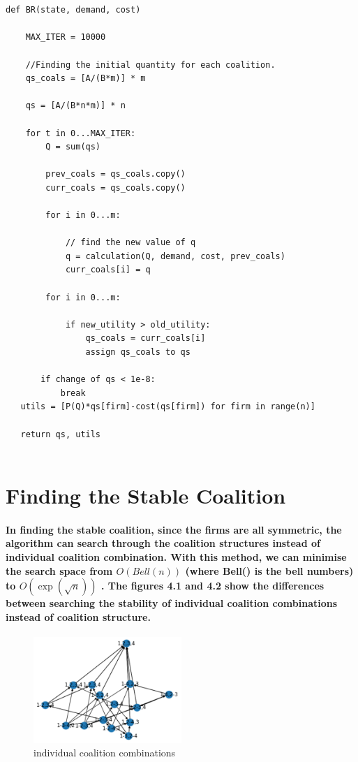 \documentclass[11pt]{report}
\begin{document}
\

\begin{lstlisting}

def BR(state, demand, cost)
    
    MAX_ITER = 10000
    
    //Finding the initial quantity for each coalition. 
    qs_coals = [A/(B*m)] * m 
    
    qs = [A/(B*n*m)] * n 

    for t in 0...MAX_ITER:
        Q = sum(qs)
        
        prev_coals = qs_coals.copy()
        curr_coals = qs_coals.copy()

        for i in 0...m:
        
            // find the new value of q
            q = calculation(Q, demand, cost, prev_coals) 
            curr_coals[i] = q
            
        for i in 0...m:
            
            if new_utility > old_utility:
                qs_coals = curr_coals[i]
                assign qs_coals to qs 
       
       if change of qs < 1e-8:
           break
   utils = [P(Q)*qs[firm]-cost(qs[firm]) for firm in range(n)]        
   
   return qs, utils


\end{lstlisting}

\section{Finding the Stable Coalition}
\paragraph{In finding the stable coalition, since the firms are all symmetric, the algorithm can search through the coalition structures instead of individual coalition combination. With this method, we can minimise the search space from $O(Bell(n))$ (where Bell() is the bell numbers) \cite{bell1934} to $O(\exp(\sqrt{n}))$ \cite{andrews1998partition}. The figures 4.1 and 4.2 show the differences between searching the stability of individual coalition combinations instead of coalition structure. }

\begin{figure}[htbp]
	\centering
	\includegraphics[width=0.5\textwidth]{images/nonsym4.jpeg}
	\caption{individual coalition combinations}
\end{figure}
\end{document}
